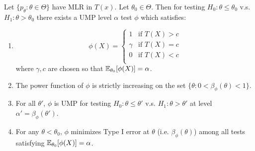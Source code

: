 \begin{theorem}
	Let $\{p_\theta : \theta \in \Theta \}$ have MLR in $T(x)$. Let $\theta_0 \in \Theta$.  Then for testing $H_0 : \theta \le \theta_0$ v.s. $H_1 : \theta > \theta_0$ there exists a UMP level $\alpha$ test $\phi$ which satisfies:
	
	\begin{enumerate}
		\item[(i)] \[
			\phi(X) = \begin{cases}
				1 &\text{if } T(X) > c \\
				\gamma &\text{if } T(X) = c \\
				0 &\text{if } T(X) < c \\
			\end{cases}
		\] where $\gamma, c$ are chosen so that $\mathbb{E}_{\theta_0}[\phi(X)] = \alpha$. 
		
		\item[(ii)] The power function of $\phi$ is strictly increasing on the set $\{\theta : 0 < \beta_{\phi}(\theta) < 1\}$. 
		
		\item[(iii)] For all $\theta'$, $\phi$ is UMP for testing $H_0 : \theta \le \theta'$ v.s. $H_1 : \theta > \theta'$ at level $\alpha' = \beta_{\phi}(\theta')$.
		
		\item[(iv)] For any $\theta < \theta_0$, $\phi$ minimizes Type I error at $\theta$ (i.e. $\beta_{\phi}(\theta)$) among all tests satisfying $\mathbb{E}_{\theta_0}[\phi(X)] = \alpha$. 
	\end{enumerate}
\end{theorem}

